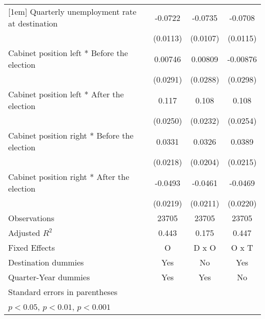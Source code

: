 \begin{table}[htbp]
\begin{tabular}{l*{3}{c}}
[1em]
Quarterly unemployment rate at destination&     -0.0722\sym{***}&     -0.0735\sym{***}&     -0.0708\sym{***}\\
                    &    (0.0113)         &    (0.0107)         &    (0.0115)         \\
[1em]
Cabinet position left * Before the election&     0.00746         &     0.00809         &    -0.00876         \\
                    &    (0.0291)         &    (0.0288)         &    (0.0298)         \\
[1em]
Cabinet position left * After the election&       0.117\sym{***}&       0.108\sym{***}&       0.108\sym{***}\\
                    &    (0.0250)         &    (0.0232)         &    (0.0254)         \\
[1em]
Cabinet position right * Before the election&      0.0331         &      0.0326         &      0.0389         \\
                    &    (0.0218)         &    (0.0204)         &    (0.0215)         \\
[1em]
Cabinet position right * After the election&     -0.0493\sym{*}  &     -0.0461\sym{*}  &     -0.0469\sym{*}  \\
                    &    (0.0219)         &    (0.0211)         &    (0.0220)         \\
\hline
Observations        &       23705         &       23705         &       23705         \\
Adjusted \(R^{2}\)  &       0.443         &       0.175         &       0.447         \\
Fixed Effects       &           O         &       D x O         &       O x T         \\
Destination dummies &         Yes         &          No         &         Yes         \\
Quarter-Year dummies&         Yes         &         Yes         &          No         \\
\hline\hline
\multicolumn{4}{l}{\footnotesize Standard errors in parentheses}\\
\multicolumn{4}{l}{\footnotesize \sym{*} \(p<0.05\), \sym{**} \(p<0.01\), \sym{***} \(p<0.001\)}\\
\end{tabular}
\end{table}
